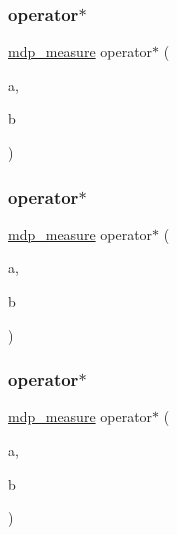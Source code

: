 \subsubsection{\texorpdfstring{operator$\ast$}{operator*}\hspace{0.1cm}{\footnotesize\ttfamily [1/3]}}
{\footnotesize\ttfamily \hyperlink{classmdp__measure}{mdp\+\_\+measure} operator$\ast$ (\begin{DoxyParamCaption}\item[{\hyperlink{classmdp__measure}{mdp\+\_\+measure}}]{a,  }\item[{\hyperlink{classmdp__measure}{mdp\+\_\+measure}}]{b }\end{DoxyParamCaption})\hspace{0.3cm}{\ttfamily [friend]}}

\mbox{\label{classmdp__measure_a6d162e2b91ef6637df21622f658e13b9}} 
\subsubsection{\texorpdfstring{operator$\ast$}{operator*}\hspace{0.1cm}{\footnotesize\ttfamily [2/3]}}
{\footnotesize\ttfamily \hyperlink{classmdp__measure}{mdp\+\_\+measure} operator$\ast$ (\begin{DoxyParamCaption}\item[{float}]{a,  }\item[{\hyperlink{classmdp__measure}{mdp\+\_\+measure}}]{b }\end{DoxyParamCaption})\hspace{0.3cm}{\ttfamily [friend]}}

\mbox{\label{classmdp__measure_aa5dcdce1ad85ba147460781e805dae6d}} 
\subsubsection{\texorpdfstring{operator$\ast$}{operator*}\hspace{0.1cm}{\footnotesize\ttfamily [3/3]}}
{\footnotesize\ttfamily \hyperlink{classmdp__measure}{mdp\+\_\+measure} operator$\ast$ (\begin{DoxyParamCaption}\item[{\hyperlink{classmdp__measure}{mdp\+\_\+measure}}]{a,  }\item[{float}]{b }\end{DoxyParamCaption})\hspace{0.3cm}{\ttfamily [friend]}}

